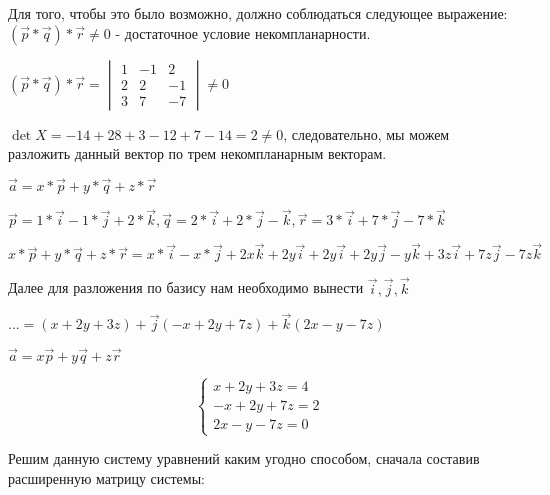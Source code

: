 \documentclass{article}
\begin{document}
Для того, чтобы это было возможно, должно соблюдаться следующее выражение: $(\overrightarrow{p} * \overrightarrow{q}) * \overrightarrow{r} \ne 0$ - достаточное условие некомпланарности.

$(\overrightarrow{p} * \overrightarrow{q}) * \overrightarrow{r} = \begin{vmatrix}
    1 & -1 & 2 \\
    2 & 2 & -1 \\
    3 & 7 & -7
\end{vmatrix} \ne 0$

$\det X = -14 + 28 + 3 - 12 + 7 - 14 = 2 \ne 0$, следовательно, мы можем разложить данный вектор по трем некомпланарным векторам.

$\overrightarrow{a} = x * \overrightarrow{p} + y * \overrightarrow{q} + z * \overrightarrow{r}$

$\overrightarrow{p} = 1 * \overrightarrow{i} - 1 * \overrightarrow{j} + 2 * \overrightarrow{k}, \overrightarrow{q} = 2 * \overrightarrow{i} + 2 * \overrightarrow{j} - \overrightarrow{k}, \overrightarrow{r} = 3 * \overrightarrow{i} + 7 * \overrightarrow{j} - 7 * \overrightarrow{k}$

$x * \overrightarrow{p} + y * \overrightarrow{q} + z * \overrightarrow{r} = x * \overrightarrow{i} - x * \overrightarrow{j} + 2x\overrightarrow{k} + 2y\overrightarrow{i} + 2y\overrightarrow{i} + 2y\overrightarrow{j} - y\overrightarrow{k} + 3z\overrightarrow{i} + 7z\overrightarrow{j} - 7z\overrightarrow{k}$

Далее для разложения по базису нам необходимо вынести $\overrightarrow{i}, \overrightarrow{j}, \overrightarrow{k}$

$... = (x + 2y + 3z) + \overrightarrow{j}(-x + 2y + 7z) + \overrightarrow{k}(2x - y - 7z)$

$\overrightarrow{a} = x\overrightarrow{p} + y\overrightarrow{q} + z\overrightarrow{r}$

\begin{equation}
    \begin{cases}
        x + 2y + 3z = 4 \\
        -x + 2y + 7z = 2 \\
        2x - y - 7z = 0
    \end{cases}
\end{equation}

Решим данную систему уравнений каким угодно способом, сначала составив расширенную матрицу системы:
\end{document}
